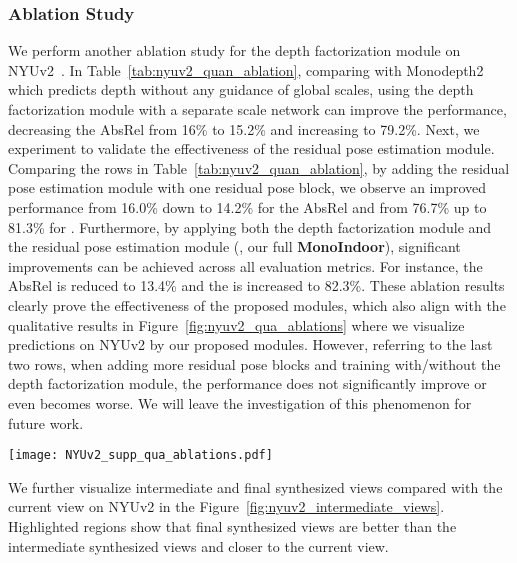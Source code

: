 \subsubsection{Ablation Study}
We perform another ablation study for the depth factorization module on NYUv2~\cite{Silberman:ECCV12}. In Table~\ref{tab:nyuv2_quan_ablation}, comparing with Monodepth2 which predicts depth without any guidance of global scales, using the depth factorization module with a separate scale network can improve the performance, decreasing the AbsRel from 16\% to 15.2\% and increasing  to 79.2\%. Next, we experiment to validate the effectiveness of the residual pose estimation module. Comparing the rows in Table~\ref{tab:nyuv2_quan_ablation}, by adding the residual pose estimation module with one residual pose block, we observe an improved performance from 16.0\% down to 14.2\% for the AbsRel and from 76.7\% up to 81.3\% for . Furthermore, by applying both the depth factorization module and the residual pose estimation module (\ie, our full \textbf{MonoIndoor}), significant improvements can be achieved across all evaluation metrics. For instance, the AbsRel is reduced to 13.4\% and the  is increased to 82.3\%. These ablation results clearly prove the effectiveness of the proposed modules, which also align with the qualitative results in Figure~\ref{fig:nyuv2_qua_ablations} where we visualize predictions on NYUv2 by our proposed modules. However, referring to the last two rows, when adding more residual pose blocks and training with/without the depth factorization module, the performance does not significantly improve or even becomes worse. We will leave the investigation of this phenomenon for future work.


\begin{figure*}[h]
\begin{center}
\texttt{[image: NYUv2\_supp\_qua\_ablations.pdf]}
\end{center}
\caption{Qualitative ablation comparisons of depth prediction on NYUv2. Our full model with both depth factorization and residual pose modules produce better depth maps.}
\label{fig:nyuv2_qua_ablations}
\end{figure*}

We further visualize intermediate and final synthesized views compared with the current view on NYUv2 in the Figure~\ref{fig:nyuv2_intermediate_views}. Highlighted regions show that final synthesized views are better than the intermediate synthesized views and closer to the current view.


